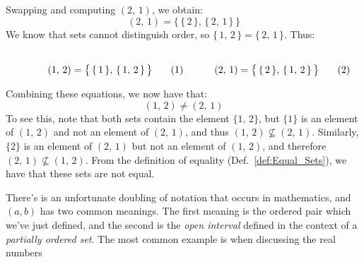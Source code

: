        Swapping and computing $(2,\,1)$, we obtain:
        \begin{equation}
            (2,\,1)=\big\{\,\{\,2\,\},\,\{\,2,\,1\,\}\,\big\}
        \end{equation}
        We know that sets cannot distinguish order, so
        $\{\,1,\,2\,\}=\{\,2,\,1\,\}$. Thus:
        \par
        \begin{subequations}
            \begin{minipage}[b]{0.49\textwidth}
                \centering
                \begin{equation}
                    (1,\,2)=\big\{\,\{\,1\,\},\,\{\,1,\,2\,\}\,\big\}
                \end{equation}
            \end{minipage}
            \hfill
            \begin{minipage}[b]{0.49\textwidth}
                \centering
                \begin{equation}
                    (2,\,1)=\big\{\,\{\,2\,\},\,\{\,1,\,2\,\}\,\big\}
                \end{equation}
            \end{minipage}
        \end{subequations}
        \par\vspace{2.5ex}
        Combining these equations, we now have that:
        \begin{equation}
            (1,\,2)\ne(2,\,1)
        \end{equation}
        To see this, note that both sets contain the element $\{1,\,2\}$, but
        $\{1\}$ is an element of $(1,\,2)$ and not an element of $(2,\,1)$,
        and thus $(1,\,2)\nsubseteq(2,\,1)$. Similarly, $\{2\}$ is an element
        of $(2,\,1)$ but not an element of $(1,\,2)$, and therefore
        $(2,\,1)\nsubseteq(1,\,2)$. From the definition of equality
        (Def.~\ref{def:Equal_Sets}), we have that these sets are not equal.
        \par\hfill\par
        There's is an unfortunate doubling of notation that occurs in
        mathematics, and $(a,b)$ has two common meanings. The first meaning is
        the ordered pair which we've just defined, and the second is the
        \textit{open interval} defined in the context of a
        \textit{partially ordered set}.
        The most common example is when discussing the real numbers
